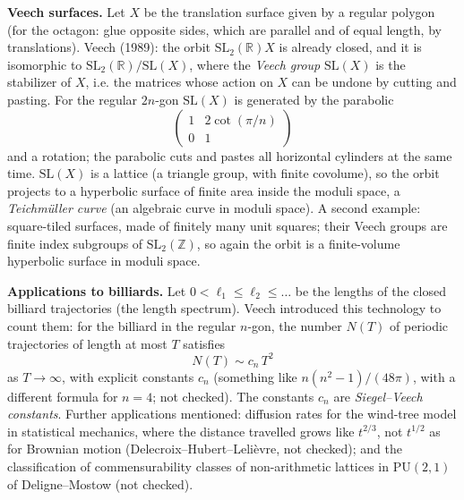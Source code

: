 \medskip\noindent
{\bf Veech surfaces.} Let $X$ be the
translation surface given by a regular
polygon (for the octagon: glue opposite
sides, which are parallel and of equal
length, by translations). Veech (1989): the
orbit $\mathrm{SL}_2(\mathbb{R})X$ is already
closed, and it is isomorphic to
$\mathrm{SL}_2(\mathbb{R})/\mathrm{SL}(X)$,
where the \emph{Veech group} $\mathrm{SL}(X)$
is the stabilizer of $X$, i.e. the matrices
whose action on $X$ can be undone by cutting
and pasting. For the regular $2n$-gon
$\mathrm{SL}(X)$ is
generated by the parabolic
$$
\begin{pmatrix} 1 & 2\cot(\pi/n) \\
0 & 1\end{pmatrix}
$$
and a rotation; the parabolic cuts and pastes
all horizontal cylinders at the same time.
$\mathrm{SL}(X)$ is a lattice (a triangle
group, with finite covolume), so the orbit
projects to a hyperbolic surface of finite
area inside the moduli space, a
\emph{Teichm\"uller curve} (an algebraic
curve in moduli space). A second example:
square-tiled surfaces, made of finitely many
unit squares; their Veech groups are finite
index subgroups of
$\mathrm{SL}_2(\mathbb{Z})$, so again the
orbit is a finite-volume hyperbolic surface
in moduli space.

\medskip\noindent
{\bf Applications to billiards.} Let
$0<\ell_1\leq\ell_2\leq\dots$ be the lengths
of the closed billiard trajectories (the
length spectrum). Veech introduced this
technology to count them: for the billiard in
the regular $n$-gon, the number $N(T)$ of
periodic trajectories of length at most $T$
satisfies
$$
N(T)\sim c_n\,T^2
$$
as $T\to\infty$, with explicit constants
$c_n$ (something like
$n(n^2-1)/(48\pi)$, with a different formula
for $n=4$; not checked). The constants $c_n$
are \emph{Siegel--Veech constants}. Further
applications mentioned: diffusion rates for
the wind-tree model in statistical mechanics,
where the distance travelled grows like
$t^{2/3}$, not $t^{1/2}$ as for Brownian
motion (Delecroix--Hubert--Leli\`evre, not
checked); and the classification of
commensurability classes of non-arithmetic
lattices in $\mathrm{PU}(2,1)$ of
Deligne--Mostow (not checked).

